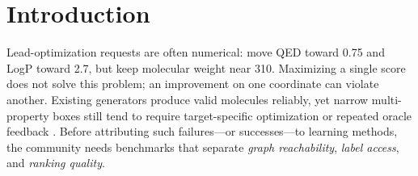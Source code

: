 \begin{abstract}
This paper audits multi-property \emph{graph navigation} on an observed MOSES BRICS edit graph with cheap RDKit descriptors (QED, LogP, MW)---not docking-, DFT-, or assay-efficient design.
Under full indexing, exact search within the observed replace-only neighborhood solves endpoint-walk episodes at zero paid queries: learning is unnecessary.
When destination structure is visible, direct $p(m')$ and effect $\Delta p$ are representationally equivalent under deterministic properties (Proposition~\ref{prop:equiv}); empirical MLP--ridge residuals are joint finite-model effects, not neural necessity of edge effects.
Preferred cost--success operating points are regime-dependent under indexing, property suite, action-space match, and oracle support.
An out-of-support MMFF probe shows that cheap-descriptor rankings do not transfer reliably.
Reported query efficiency here is largely explained by benchmark assumptions (Tables~\ref{tab:regimes}--\ref{tab:claims}).
\end{abstract}

\section{Introduction}
\label{sec:intro}

Lead-optimization requests are often numerical: move QED toward 0.75 and LogP toward 2.7, but keep molecular weight near 310. Maximizing a single score does not solve this problem; an improvement on one coordinate can violate another. Existing generators produce valid molecules reliably, yet narrow multi-property boxes still tend to require target-specific optimization or repeated oracle feedback \citep{sanchez2018inverse,brown2019guacamol}. Before attributing such failures---or successes---to learning methods, the community needs benchmarks that separate \emph{graph reachability}, \emph{label access}, and \emph{ranking quality}.

